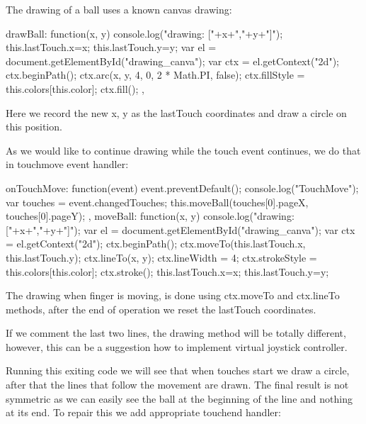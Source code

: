 The drawing of a ball uses a known canvas drawing:

\begin{js}
    drawBall: function(x, y){
		console.log("drawing: ["+x+","+y+"]");
		this.lastTouch.x=x;
		this.lastTouch.y=y;
		var el = document.getElementById("drawing_canva");
		var ctx = el.getContext("2d");
		ctx.beginPath();
		ctx.arc(x, y, 4, 0, 2 * Math.PI, false);
		ctx.fillStyle = this.colors[this.color];
		ctx.fill();
	},
\end{js}

\begin{explain}
Here we record the new x, y as the lastTouch coordinates and draw a circle on this position.
\end{explain}

As we would like to continue drawing while the touch event continues, we do that in touchmove event handler:

\begin{js}
    onTouchMove: function(event){
		event.preventDefault();
		console.log("TouchMove");
		var touches = event.changedTouches;
		this.moveBall(touches[0].pageX, touches[0].pageY);
	},
    moveBall: function(x, y){
		console.log("drawing: ["+x+","+y+"]");
		var el = document.getElementById("drawing_canva");
		var ctx = el.getContext("2d");
		ctx.beginPath();
		ctx.moveTo(this.lastTouch.x, this.lastTouch.y);
		ctx.lineTo(x, y);
		ctx.lineWidth = 4;
		ctx.strokeStyle = this.colors[this.color];
		ctx.stroke();
		this.lastTouch.x=x;
		this.lastTouch.y=y;
	}
\end{js}

\begin{explain}
The drawing when finger is moving, is done using ctx.moveTo and ctx.lineTo methods, after the end of operation we reset the lastTouch coordinates.
\end{explain}

\begin{extercises}
If we comment the last two lines, the drawing method will be totally different, however, this can be a suggestion how to implement virtual joystick controller.
\end{extercises}

Running this exiting code we will see that when touches start we draw a circle, after that the lines that follow the movement are drawn. The final result is not symmetric as we can easily see the ball at the beginning of the line and nothing at its end. To repair this we add appropriate touchend handler:

